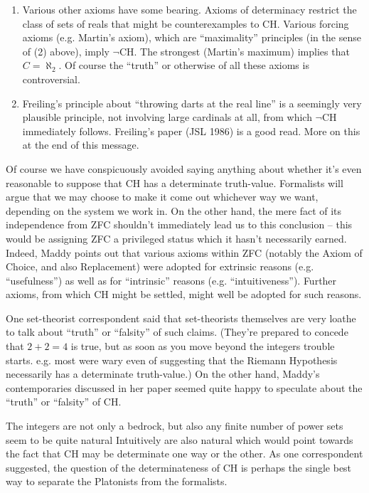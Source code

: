\begin{enumerate}
  \item Various other axioms have some bearing.  Axioms of determinacy
  restrict the class of sets of reals that might be counterexamples to
  CH.  Various forcing axioms (e.g. Martin's axiom), which are
  ``maximality'' principles (in the sense of (2) above), imply $\neg$CH.
  The strongest (Martin's maximum) implies that $C = \aleph_2$.  Of
  course the ``truth'' or otherwise of all these axioms is
  controversial.

  \item Freiling's principle about ``throwing darts at the real line''
  is a seemingly very plausible principle, not involving large cardinals
  at all, from which $\neg$CH immediately follows.  Freiling's paper
  (JSL 1986) is a good read.  More on this at the end of this message.
\end{enumerate}

Of course we have conspicuously avoided saying anything about whether
it's even reasonable to suppose that CH has a determinate truth-value.
Formalists will argue that we may choose to make it come out whichever
way we want, depending on the system we work in.  On the other hand, the
mere fact of its independence from ZFC shouldn't immediately lead us to
this conclusion -- this would be assigning ZFC a privileged status which
it hasn't necessarily earned.  Indeed, Maddy points out that various
axioms within ZFC (notably the Axiom of Choice, and also Replacement)
were adopted for extrinsic reasons (e.g. ``usefulness'') as well as for
``intrinsic'' reasons (e.g. ``intuitiveness'').  Further axioms, from
which CH might be settled, might well be adopted for such reasons.

One set-theorist correspondent said that set-theorists themselves are
very loathe to talk about ``truth'' or ``falsity'' of such claims.
(They're prepared to concede that $2+2=4$ is true, but as soon as you
move beyond the integers trouble starts.  e.g. most were wary even of
suggesting that the Riemann Hypothesis necessarily has a determinate
truth-value.)  On the other hand, Maddy's contemporaries discussed in
her paper seemed quite happy to speculate about the ``truth'' or
``falsity'' of CH.

The integers are not only a bedrock, but also any finite number of power
sets seem to be quite natural Intuitively are also natural which would
point towards the fact that CH may be determinate one way or the other.
As one correspondent suggested, the question of the determinateness of
CH is perhaps the single best way to separate the Platonists from the
formalists.

